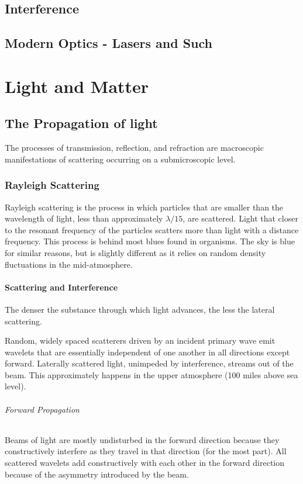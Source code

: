 \documentclass[12pt]{report}
\begin{document}
\chapter{Interference}
\chapter{Modern Optics - Lasers and Such}



\part{Light and Matter}

\chapter{The Propagation of light}
The processes of transmission, reflection, and refraction are macroscopic manifestations of scattering occurring on a submicroscopic level. 
\section{Rayleigh Scattering}
Rayleigh scattering is the process in which particles that are smaller than the wavelength of light, less than approximately $\lambda/15$, are scattered. Light that closer to the resonant frequency of the particles scatters more than light with a distance frequency. This process is behind most blues found in organisms. The sky is blue for similar reasons, but is slightly different as it relies on random density fluctuations in the mid-atmosphere.
\subsection{Scattering and Interference} 
The denser the substance through which light advances, the less the lateral scattering. 

Random, widely spaced scatterers driven by an incident primary wave emit wavelets that are essentially independent of one another in all directions except forward. Laterally scattered light, unimpeded by interference, streams out of the beam. This approximately happens in the upper atmosphere (100 miles above sea level). 
\paragraph{Forward Propagation}
Beams of light are mostly undisturbed in the forward direction because they constructively interfere as they travel in that direction (for the most part). All scattered wavelets add constructively with each other in the forward direction because of the asymmetry introduced by the beam. 
\end{document}
